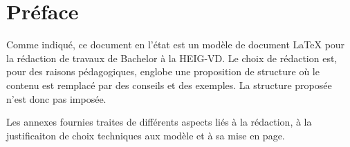\chapter*{Préface}

Comme indiqué, ce document en l'état est un modèle de document \LaTeX{} pour la rédaction de travaux de Bachelor à la HEIG-VD. Le choix de rédaction est, pour des raisons pédagogiques, englobe une proposition de structure où le contenu est remplacé par des conseils et des exemples. La structure proposée n'est donc pas imposée.

Les annexes fournies traites de différents aspects liés à la rédaction, à la justificaiton de choix techniques aux modèle et à sa mise en page.

